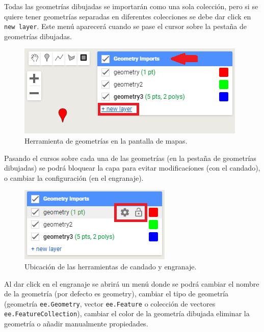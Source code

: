 \documentclass[
  12pt,
  letterpaper,
  twoside]{book}
\begin{document}
Todas las geometrías dibujadas se importarán como una sola colección, pero si se quiere tener geometrías separadas en diferentes colecciones se debe dar click en \texttt{new\ layer}. Este menú aparecerá cuando se pase el cursor sobre la pestaña de geometrías dibujadas.

\begin{figure}

{\centering \includegraphics[width=0.6\linewidth]{Img/nuevaGeo} 

}

\caption{Herramienta de geometrías en la pantalla de mapas.}\label{fig:unnamed-chunk-60}
\end{figure}

Pasando el cursos sobre cada una de las geometrías (en la pestaña de geometrías dibujadas) se podrá bloquear la capa para evitar modificaciones (con el candado), o cambiar la configuración (en el engranaje).

\begin{figure}

{\centering \includegraphics[width=0.4\linewidth]{Img/dibujarGeo} 

}

\caption{Ubicación de las herramientas de candado y engranaje.}\label{fig:unnamed-chunk-61}
\end{figure}

Al dar click en el engranaje se abrirá un menú donde se podrá cambiar el nombre de la geometría (por defecto es geometry), cambiar el tipo de geometría (geometría \texttt{ee.Geometry}, vector \texttt{ee.Feature} o colección de vectores \texttt{ee.FeatureCollection}), cambiar el color de la geometría dibujada eliminar la geometría o añadir manualmente propiedades.
\end{document}
